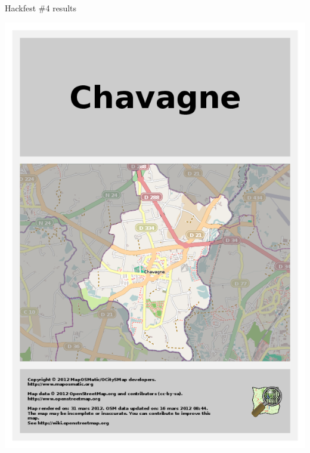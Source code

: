 \documentclass{beamer}
\begin{document}
\begin{frame}{Hackfest \#4 results}
  \begin{center}
    \includegraphics[height=0.8\textheight]{chavagne-multi-page-front.png}

\end{center}
\end{frame}
\end{document}
